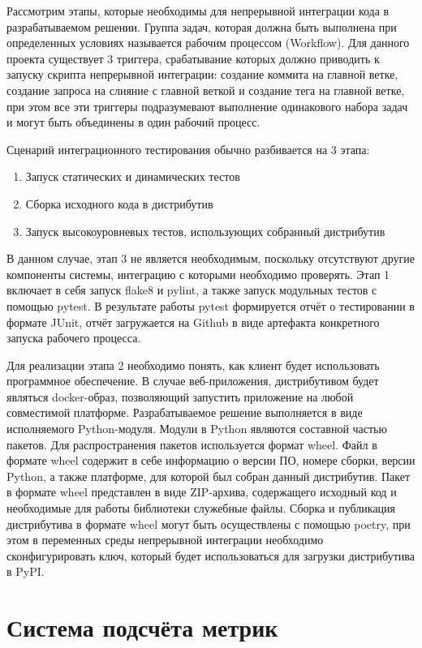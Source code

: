 Рассмотрим этапы, которые необходимы для непрерывной интеграции кода в
разрабатываемом решении. Группа задач, которая должна быть выполнена при
определенных условиях называется рабочим процессом (Workflow). Для данного
проекта существует 3 триггера, срабатывание которых должно приводить к запуску
скрипта непрерывной интеграции: создание коммита на главной ветке, создание
запроса на слияние с главной веткой и создание тега на главной ветке, при этом
все эти триггеры подразумевают выполнение одинакового набора задач и могут быть
объединены в один рабочий процесс.

Сценарий интеграционного тестирования обычно разбивается на 3 этапа:

\begin{enumerate}
    \item Запуск статических и динамических тестов
    \item Сборка исходного кода в дистрибутив
    \item Запуск высокоуровневых тестов, использующих собранный дистрибутив
\end{enumerate}

В данном случае, этап 3 не является необходимым, поскольку отсутствуют другие
компоненты системы, интеграцию с которыми необходимо проверять. Этап 1 включает
в себя запуск flake8 и pylint, а также запуск модульных тестов с помощью pytest.
В результате работы pytest формируется отчёт о тестировании в формате JUnit,
отчёт загружается на Github в виде артефакта конкретного запуска рабочего
процесса.

Для реализации этапа 2 необходимо понять, как клиент будет использовать
программное обеспечение. В случае веб-приложения, дистрибутивом будет являться
docker-образ, позволяющий запустить приложение на любой совместимой платформе.
Разрабатываемое решение выполняется в виде исполняемого Python-модуля. Модули в
Python являются составной частью пакетов. Для распространения пакетов
используется формат wheel. Файл в формате wheel содержит в себе информацию о
версии ПО, номере сборки, версии Python, а также платформе, для которой был
собран данный дистрибутив. Пакет в формате wheel представлен в виде ZIP-архива,
содержащего исходный код и необходимые для работы библиотеки служебные файлы.
Сборка и публикация дистрибутива в формате wheel могут быть осуществлены с
помощью poetry, при этом в переменных среды непрерывной интеграции необходимо
сконфигурировать ключ, который будет использоваться для загрузки дистрибутива в
PyPI.


\newpage
\chapter{Система подсчёта метрик}

